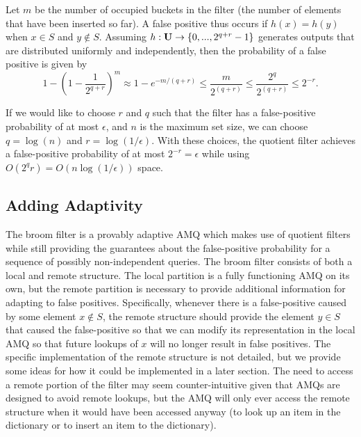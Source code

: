 \documentclass[../paper.tex]{subfiles}
\begin{document}
    
    Let $m$ be the number of occupied buckets in the filter (the number of elements that have been inserted so far). A false positive thus occurs if $h(x) =
    h(y)$ when $x \in S$ and $y \notin S$.  Assuming $h: {\bf U} \rightarrow
    \{0, ... , 2^{q+r}-1\}$ generates outputs that are distributed uniformly
    and independently, then the probability of a false positive is given by $$
    1 - \left(1 - \frac{1}{2^{q+r}}\right)^m \approx 1- e^{-m/(q+r)} \leq
    \frac{m}{2^{(q+r)}} \leq \frac{2^q}{2^{(q+r)}} \leq 2^{-r}.$$

    If we would like to choose $r$ and $q$ such that the filter has a false-positive
    probability of at most $\epsilon$, and $n$ is the maximum set size, we can choose $q=\log(n)$
    and $r=\log(1/\epsilon)$.
    With these choices, the quotient filter achieves a false-positive probability of at most
    $2^{-r} = \epsilon$ while using $O(2^q r) = O(n \log (1/\epsilon))$ space.  	

\subsection{Adding Adaptivity}

The broom filter is a provably adaptive AMQ which makes use of quotient filters
while still providing the guarantees about the false-positive probability for
a sequence of possibly non-independent queries. The broom filter consists
of both a local and remote structure. The local partition is a fully functioning
AMQ on its own, but the remote partition is necessary to provide additional
information for adapting to false positives. Specifically, whenever there is
a false-positive caused by some element $x \notin S$, the remote structure
should provide the element $y \in S$ that caused the false-positive so
that we can modify its representation in the local AMQ so that future lookups
of $x$ will no longer result in false positives. The specific implementation
of the remote structure is not detailed, but we provide some ideas for
how it could be implemented in a later section. The need to access a remote
portion of the filter may seem counter-intuitive given that AMQs are designed
to avoid remote lookups, but the AMQ will only ever access the remote structure
when it would have been accessed anyway (to look up an item in the dictionary or
to insert an item to the dictionary).
\end{document}
